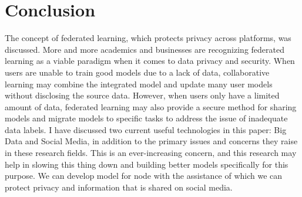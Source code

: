 \documentclass[openacc]{rsproca_new}%
\begin{document}
\section{Conclusion}
The concept of federated learning, which protects privacy across platforms, was discussed. More and more academics and businesses are recognizing federated learning as a viable paradigm when it comes to data privacy and security. When users are unable to train good models due to a lack of data, collaborative learning may combine the integrated model and update many user models without disclosing the source data. However, when users only have a limited amount of data, federated learning may also provide a secure method for sharing models and migrate models to specific tasks to address the issue of inadequate data labels.
I have discussed two current useful technologies in this paper: Big Data and Social Media, in addition to the primary issues and concerns they raise in these research fields.
This is an ever-increasing concern, and this research may help in slowing this thing down and building better models specifically for this purpose. We can develop model for node with the assistance of which we can protect privacy and information that is shared on social media.\vskip6pt

\enlargethispage{20pt}





\vskip2pc
\end{document}
